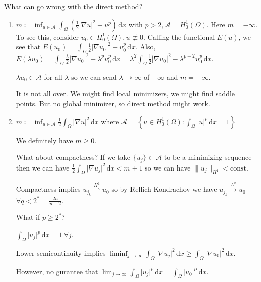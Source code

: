 \documentclass{article}
\theoremstyle{definition}
\begin{document}
What can go wrong with the direct method?

\begin{enumerate}[label=\arabic*)]
    \item \(m \coloneqq \inf_{u\in \mathcal{A}} \int_{\Omega} \left( \frac{1}{2} \vert \nabla u \vert ^2 - u^p \right) \,\mathrm{d}x \) with \(p > 2, \mathcal{A} = H^1_0(\Omega)\). Here \(m = - \infty\). To see this, consider \(u_0 \in H^1_0(\Omega), u \not \equiv 0\). Calling the functional \(E(u)\), we see that \(E(u_0) = \int_{\Omega} \frac{1}{2} \vert \nabla u_0 \vert ^ 2 - u_0^p \,\mathrm{d}x \). Also, \(E(\lambda u_0) = \int_{\Omega} \frac{\lambda}{2} \vert \nabla u_0 \vert ^2 - \lambda^p u_0^p \,\mathrm{d}x = \lambda^2 \int_{\Omega} \frac{1}{2} \vert \nabla u_0 \vert ^2 - \lambda^{p-2} u_0^p \,\mathrm{d}x \).
    
    \(\lambda u_0 \in \mathcal{A}\) for all \(\lambda\) so we can send \(\lambda\to \infty\) of \(-\infty\) and \(m = - \infty\).

    It is not all over. We might find local minimizers, we might find saddle points. But no global minimizer, so direct method might work.

    \item \(m \coloneqq \inf_{u\in \mathcal{A}} \frac{1}{2} \int_{\Omega} \vert \nabla u \vert ^ 2 \,\mathrm{d}x \) where \(\mathcal{A} = \left\{ u \in H^1_0(\Omega) : \int_{\Omega} \vert u \vert ^ p \,\mathrm{d}x = 1 \right\} \)  
    
    We definitely have \(m \geq 0\).

    What about compactness? If we take \(\{ u_j \} \subset \mathcal{A}\) to be a minimizing sequence then we can have \(\frac{1}{2} \int_{\Omega} \vert \nabla u_j \vert ^2 \,\mathrm{d}x < m + 1\) so we can have \(\lVert u_j \rVert _{H^1_0} < \text{const}\).

    Compactness implies \(u_{j_k} \overset{H^1}{\rightharpoonup} u_0\)  so by Rellich-Kondrachov we have \(u_{j_k} \overset{L^q}{\to} u_0\) \(\forall q < 2^{\ast} = \frac{2n}{n-2}\).
    
    What if \(p \geq 2^{\ast}\)?

    \(\int_{\Omega} \vert u_j \vert ^ p \,\mathrm{d}x = 1 \, \forall j\).

    Lower semicontinuity implies \(\liminf_{j \to \infty} \int_{\Omega} \vert \nabla u_j \vert ^2 \,\mathrm{d}x \geq \int_{\Omega} \vert \nabla u_0 \vert ^ 2 \,\mathrm{d}x \).

    However, no gurantee that \(\lim_{j \to \infty} \int_{\Omega} \vert u_j \vert ^ p \,\mathrm{d}x = \int_{\Omega} \vert u_0 \vert ^ p \,\mathrm{d}x \).


\end{enumerate}
\end{document}
